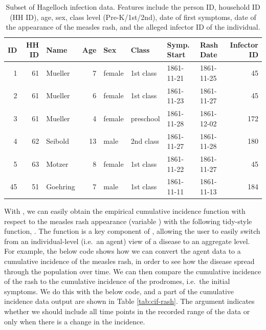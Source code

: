 \documentclass[
  shortnames]{jss}
\begin{document}
\begin{CodeChunk}
\begin{table}[!h]

\caption{\label{tab:hags-people}Subset of Hagelloch infection data.  Features include the person ID, household ID (HH ID), age, sex, class level (Pre-K/1st/2nd), date of first symptoms, date of the appearance of the measles rash, and the alleged infector ID of the individual.}
\centering
\begin{tabular}[t]{rrlrllllr}
\toprule
ID & HH ID & Name & Age & Sex & Class & Symp. Start & Rash Date & Infector ID\\
\midrule
1 & 61 & Mueller & 7 & female & 1st class & 1861-11-21 & 1861-11-25 & 45\\
2 & 61 & Mueller & 6 & female & 1st class & 1861-11-23 & 1861-11-27 & 45\\
3 & 61 & Mueller & 4 & female & preschool & 1861-11-28 & 1861-12-02 & 172\\
4 & 62 & Seibold & 13 & male & 2nd class & 1861-11-27 & 1861-11-28 & 180\\
5 & 63 & Motzer & 8 & female & 1st class & 1861-11-22 & 1861-11-27 & 45\\
45 & 51 & Goehring & 7 & male & 1st class & 1861-11-11 & 1861-11-13 & 184\\
\bottomrule
\end{tabular}
\end{table}

\end{CodeChunk}

With , we can easily obtain the empirical cumulative
incidence function with respect to the measles rash appearance (variable
) with the following tidy-style function,
. The function  is a
key component of , allowing the user to easily switch
from an individual-level (i.e.~an agent) view of a disease to an
aggregate level. For example, the below code shows how we can convert
the agent data to a cumulative incidence of the measles rash, in order
to see how the disease spread through the population over time. We can
then compare the cumulative incidence of the rash to the cumulative
incidence of the prodromes, i.e.~the initial symptoms. We do this with
the below code, and a part of the cumulative incidence data output are
shown in Table \ref{tab:cif-rash}. The argument
 indicates whether we should include all
time points in the recorded range of the data or only when there is a
change in the incidence.
\end{document}
